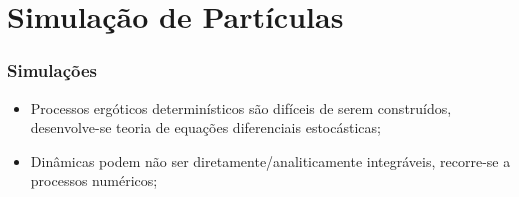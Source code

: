 

\section{Simulação de Partículas}

\begin{frame}
	\frametitle{Simulações}
	
	\begin{itemize}
		\item Processos ergóticos determinísticos são difíceis de serem construídos, desenvolve-se teoria de equações diferenciais estocásticas;
		\pause
		\item Dinâmicas podem não ser diretamente/analiticamente integráveis, recorre-se a processos numéricos;
	\end{itemize}
\end{frame}

